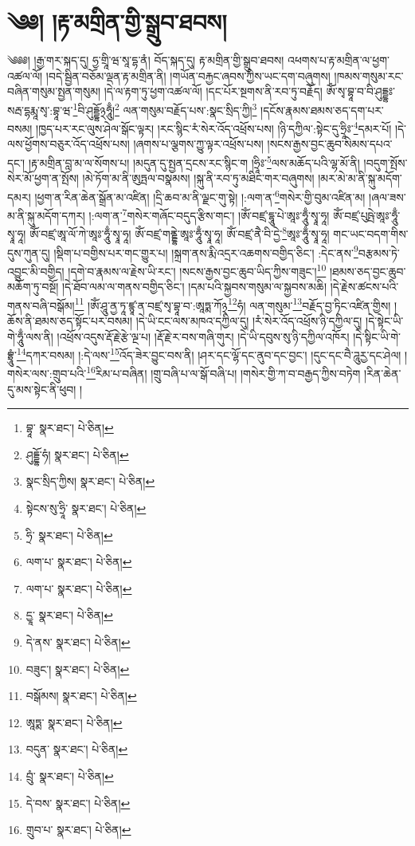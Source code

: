 \setcounter{footnote}{0} 
\chapter{༄༅། །རྟ་མགྲིན་གྱི་སྒྲུབ་ཐབས།}༄༅༅། །རྒྱ་གར་སྐད་དུ། ཧྱ་གྲཱི་ཝ་སཱ་དྷ་ནཾ། བོད་སྐད་དུ། རྟ་མགྲིན་གྱི་སྒྲུབ་ཐབས། འཕགས་པ་རྟ་མགྲིན་ལ་ཕྱག་འཚལ་ལོ། །བདེ་སྦྱིན་བཅོམ་ལྡན་རྟ་མགྲིན་ནི། །གཡོན་བརྐྱང་ཞབས་ཀྱིས་ཡང་དག་བཞུགས། །ཁམས་གསུམ་རང་བཞིན་གསུམ་སྤྱན་གསུམ། །དེ་ལ་རྟག་ཏུ་ཕྱག་འཚལ་ལོ། །དང་པོར་སྔགས་ནི་རབ་ཏུ་བརྗོད། ཨོཾ་སྭ་བྷཱ་བ་བི་ཤུདྡྷཿ་སརྦ་དྷརྨཱ་སྭ་:བྷཱ་ཝ་\footnote{བྷཱ་  སྣར་ཐང་།  པེ་ཅིན། }བི་ཤུདྡྷོ྅ཧཱུྃ།\footnote{ཤུདྡྷོ་ཧཾ།  སྣར་ཐང་།  པེ་ཅིན། } ལན་གསུམ་བརྗོད་པས་:སྣང་སྲིད་ཀྱི།\footnote{སྣང་སྲིད་ཀྱིས།  སྣར་ཐང་།  པེ་ཅིན། } །དངོས་རྣམས་ཐམས་ཅད་དག་པར་བསམ། །ཁྱད་པར་རང་ལུས་ཤེལ་སྒོང་ལྟར། །རང་སྙིང་རཾ་སེར་འོད་འཕྲོས་པས། །ཉི་དཀྱིལ་:སྟེང་དུ་ཧྲཱིཿ་\footnote{སྟེངས་སུ་ཧྲཱི་  སྣར་ཐང་།  པེ་ཅིན། }དམར་པོ། །དེ་ལས་ཕྱོགས་བཅུར་འོད་འཕྲོས་པས། །ཞགས་པ་ལྕགས་ཀྱུ་ལྟར་འཕྲོས་པས། །སངས་རྒྱས་བྱང་ཆུབ་སེམས་དཔའ་དང་། །རྟ་མགྲིན་བླ་མ་ལ་སོགས་པ། །མདུན་དུ་སྤྱན་དྲངས་རང་སྙིང་ག །ཧྲཱིཿ་\footnote{ཧྲི་  སྣར་ཐང་།  པེ་ཅིན། }ལས་མཆོད་པའི་ལྷ་མོ་ནི། །བདུག་སྤོས་སེར་མོ་ཕྱག་ན་སྤོས། །མེ་ཏོག་མ་ནི་ཨུཏྤལ་བསྣམས། །སྐུ་ནི་རབ་ཏུ་མཐིང་གར་བཞུགས། །མར་མེ་མ་ནི་སྐུ་མདོག་དམར། །ཕྱག་ན་རིན་ཆེན་སྒྲོན་མ་འཛིན། །དྲི་ཆབ་མ་ནི་ལྗང་གུ་སྟེ། །:ལག་ན་\footnote{ལག་པ་  སྣར་ཐང་།  པེ་ཅིན། }གསེར་གྱི་བུམ་འཛིན་མ། །ཞལ་ཟས་མ་ནི་སྐུ་མདོག་དཀར། །:ལག་ན་\footnote{ལག་པ་  སྣར་ཐང་།  པེ་ཅིན། }གསེར་གཞོང་བདུད་རྩིས་གང་། །ཨོཾ་བཛྲ་དྷཱུ་པེ་ཨཱཿ་ཧཱུྃ་སྭཱ་ཧཱ། ཨོཾ་བཛྲ་པུཥྤེ་ཨཱཿ་ཧཱུྃ་སྭཱ་ཧཱ། ཨོཾ་བཛྲ་ཨཱ་ལོ་ཀེ་ཨཱཿ་ཧཱུྃ་སྭཱ་ཧཱ། ཨོཾ་བཛྲ་གནྡྷེ་ཨཱཿ་ཧཱུྃ་སྭཱ་ཧཱ། ཨོཾ་བཛྲ་ནཻ་བི་དྱེ་\footnote{དྱཱ་  སྣར་ཐང་།  པེ་ཅིན། }ཨཱཿ་ཧཱུྃ་སྭཱ་ཧཱ། གང་ཡང་བདག་གིས་དུས་ཀུན་དུ། །སྡིག་པ་བགྱིས་པར་གང་གྱུར་པ། །སྐྲག་ནས་རྨི་འདྲར་འཆགས་བགྱིད་ཅིང་། :དེང་ནས་\footnote{དེ་ནས་  སྣར་ཐང་།  པེ་ཅིན། }བརྩམས་ཏེ་འབྱུང་མི་བགྱིད། །དགེ་བ་རྣམས་ལ་རྗེས་ཡི་རང་། །སངས་རྒྱས་བྱང་ཆུབ་ཡིད་ཀྱིས་གཟུང་།\footnote{བཟུང་།  སྣར་ཐང་།  པེ་ཅིན། } །ཐམས་ཅད་བྱང་ཆུབ་མཆོག་ཏུ་བསྔོ། །དེ་ཐོབ་ལམ་ལ་གནས་བགྱིད་ཅིང་། །དམ་པའི་སྐྱབས་གསུམ་ལ་སྐྱབས་མཆི། །དེ་རྗེས་ཚངས་པའི་གནས་བཞི་བསྒོམ།\footnote{བསྒོམས།  སྣར་ཐང་།  པེ་ཅིན། } །ཨོཾ་ཤཱུ་ནྱ་ཏཱ་ཛྙཱ་ན་བཛྲ་སྭ་བྷཱ་བ་:ཨཱཏྨ་ཀོ྅\footnote{ཨཱཏྨ་  སྣར་ཐང་།  པེ་ཅིན། }ཧཾ། ལན་གསུམ་\footnote{བདུན་  སྣར་ཐང་།  པེ་ཅིན། }བརྗོད་བྱ་ཏིང་འཛིན་གྱིས། །ཆོས་ནི་ཐམས་ཅད་སྟོང་པར་བསམ། །དེ་ཡི་ངང་ལས་མཁའ་དཀྱིལ་དུ། །རཾ་སེར་འོད་འཕྲོས་ཉི་དཀྱིལ་དུ། །དེ་སྟེང་ཡི་གེ་ཧཱུྃ་ལས་ནི། །འཕྲོས་འདུས་རྡོ་རྗེ་རྩེ་ལྔ་པ། །རྡོ་རྗེ་ར་བས་གཞི་གུར། །དེ་ཡི་དབུས་སུ་ཉི་དཀྱིལ་འཁོར། །དེ་སྟིང་ཡི་གེ་བྷྲཱུཾ་\footnote{བྲུཾ་  སྣར་ཐང་།  པེ་ཅིན། }དཀར་བསམ། །:དེ་ལས་\footnote{དེ་བས་  སྣར་ཐང་།  པེ་ཅིན། }འོད་ཟེར་བྱུང་བས་ནི། །ཤར་དང་ལྷོ་དང་ནུབ་དང་བྱང་། །དུང་དང་བཻ་ཌཱུརྱ་དང་ཤེལ། །གསེར་ལས་:གྲུབ་པའི་\footnote{གྲུབ་པ་  སྣར་ཐང་།  པེ་ཅིན། }རིམ་པ་བཞིན། །གྲུ་བཞི་པ་ལ་སྒོ་བཞི་པ། །གསེར་གྱི་ཀ་བ་བརྒྱད་ཀྱིས་བཏེག །རིན་ཆེན་དུ་མས་སྟེང་ནི་ཕུབ། །
